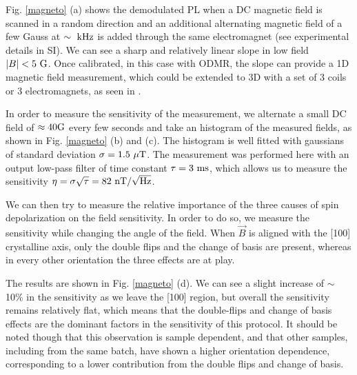 \documentclass[preprintnumbers,amsmath,amssymb,superscriptaddress,twocolumn,showpacs]{revtex4-2}
\begin{document}
Fig. \ref{magneto} (a) shows the demodulated PL when a DC magnetic field is scanned in a random direction and an additional alternating magnetic field of a few Gauss at $\sim \ \rm kHz$ is added through the same electromagnet (see experimental details in SI). We can see a sharp and relatively linear slope in low field $\abs{B} < 5\ \rm G$. Once calibrated, in this case with ODMR, the slope can provide a 1D magnetic field measurement, which could be extended to 3D with a set of 3 coils or 3 electromagnets, as seen in \cite{zheng_microwave-free_2020}.

In order to measure the sensitivity of the measurement, we alternate a small DC field of $\approx 40 \rm G$ every few seconds and take an histogram of the measured fields, as shown in Fig. \ref{magneto} (b) and (c). The histogram is well fitted with gaussians of standard deviation $\sigma=1.5\ \mu \rm T$. The measurement was performed here with an output low-pass filter of time constant $\tau=3\ \rm ms$, which allows us to measure the sensitivity $\eta=\sigma \sqrt{\tau}=82\ \rm{nT}/\sqrt{\rm Hz}$.

We can then try to measure the relative importance of the three causes of spin depolarization on the field sensitivity. In order to do so, we measure the sensitivity while changing the angle of the field. When $\vec B$ is aligned with the [100] crystalline axis, only the double flips and the change of basis are present, whereas in every other orientation the three effects are at play.

The results are shown in Fig. \ref{magneto} (d). We can see a slight increase of $\sim$ 10\% in the sensitivity as we leave the [100] region, but overall the sensitivity remains relatively flat, which means that the double-flips and change of basis effects are the dominant factors in the sensitivity of this protocol. %
It should be noted though that this observation is sample dependent, and that other samples, including from the same batch, have shown a higher orientation dependence, corresponding to a lower contribution from the double flips and change of basis.
\end{document}
